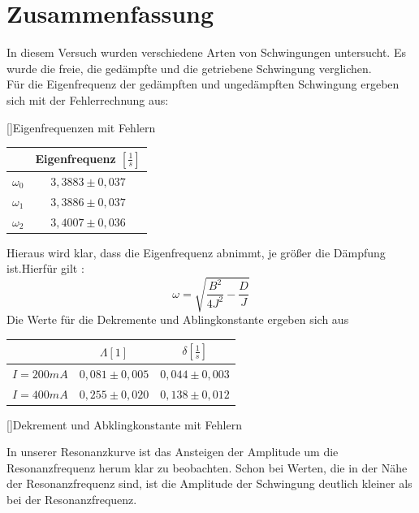 \documentclass[12pt,a4paper,]{scrreprt}
\begin{document}
    
    
    
    
      
    
    
\chapter{Zusammenfassung}
In diesem Versuch wurden verschiedene Arten von Schwingungen untersucht. Es wurde die freie, die gedämpfte und die getriebene Schwingung verglichen.\\
	Für die Eigenfrequenz der gedämpften und ungedämpften Schwingung  ergeben sich mit der Fehlerrechnung aus: \\
    \begin{center}
    	[]{Eigenfrequenzen mit Fehlern}
    	\begin{tabular}{c|c}
    		 & Eigenfrequenz $[\frac{1}{s}]$\\ \hline
             $\omega_0$ & $3,3883 \pm 0,037$\\
             $\omega_1$ & $3,3886 \pm 0,037$\\
             $\omega_2$ & $3,4007 \pm 0,036$\\
    	\end{tabular}
        
    \end{center}
	Hieraus wird klar, dass die Eigenfrequenz abnimmt, je größer die Dämpfung ist.Hierfür gilt :
	\begin{equation}
		\omega=\sqrt{\frac{B^2}{4J^2} - \frac{D}{J}}
	\end{equation}
	Die Werte für die Dekremente und Ablingkonstante ergeben sich aus   \\
    \begin{center}
    
    \begin{tabular}{l|cc}
    		& $\Lambda [1]$ & $\delta [\frac{1}{s}]$		\\ \hline
    	$I = 200mA$ & $0,081 \pm 0,005$ &  $0,044 \pm 0,003$\\
        $I = 400mA$ & $0,255 \pm 0,020$ & $0,138 \pm 0,012$
    \end{tabular} 
    []{Dekrement und Abklingkonstante mit Fehlern}
    \end{center}
    In unserer Resonanzkurve ist das Ansteigen der Amplitude um die Resonanzfrequenz herum klar zu beobachten. Schon bei Werten, die in der Nähe der Resonanzfrequenz sind, ist die Amplitude der Schwingung deutlich kleiner als bei der Resonanzfrequenz.\\
\end{document}
